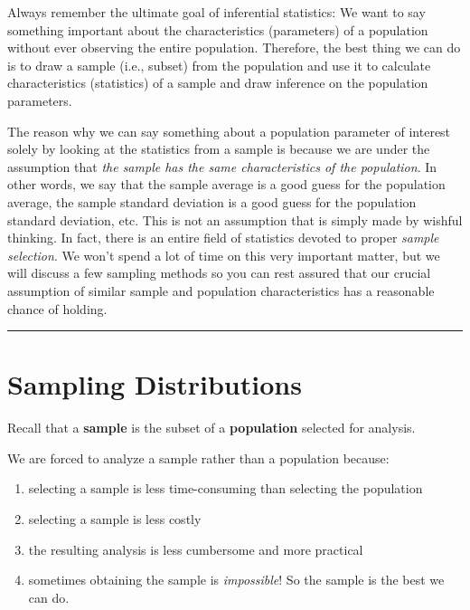 \documentclass[
]{book}
\begin{document}
Always remember the ultimate goal of inferential statistics: We want to say something important about the characteristics (parameters) of a population without ever observing the entire population. Therefore, the best thing we can do is to draw a sample (i.e., subset) from the population and use it to calculate characteristics (statistics) of a sample and draw inference on the population parameters.

The reason why we can say something about a population parameter of interest solely by looking at the statistics from a sample is because we are under the assumption that \emph{the sample has the same characteristics of the population}. In other words, we say that the sample average is a good guess for the population average, the sample standard deviation is a good guess for the population standard deviation, etc. This is not an assumption that is simply made by wishful thinking. In fact, there is an entire field of statistics devoted to proper \emph{sample selection}. We won't spend a lot of time on this very important matter, but we will discuss a few sampling methods so you can rest assured that our crucial assumption of similar sample and population characteristics has a reasonable chance of holding.

\begin{center}\rule{0.5\linewidth}{0.5pt}\end{center}

\hypertarget{sampling-distributions}{%
\section{Sampling Distributions}\label{sampling-distributions}}

Recall that a \textbf{sample} is the subset of a \textbf{population} selected for analysis.

We are forced to analyze a sample rather than a population because:

\begin{enumerate}
\def\labelenumi{\arabic{enumi}.}
\item
  selecting a sample is less time-consuming than selecting the population
\item
  selecting a sample is less costly
\item
  the resulting analysis is less cumbersome and more practical
\item
  sometimes obtaining the sample is \emph{impossible}! So the sample is the best we can do.
\end{enumerate}
\end{document}

